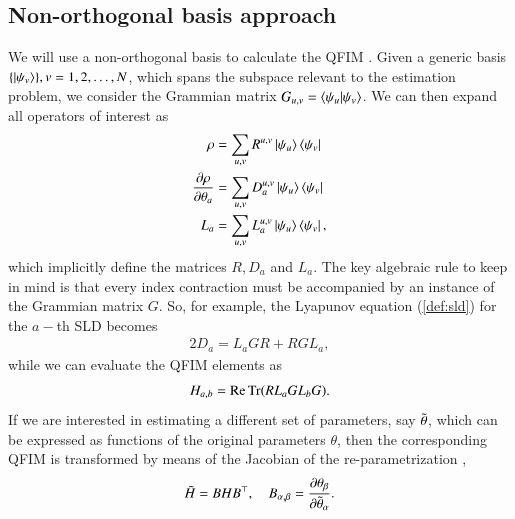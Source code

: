 \documentclass[reprint,amsmath,amssymb,aps,pra,floatfix]{revtex4-2}
\begin{document}
\subsection{Non-orthogonal basis approach}
We will use a non-orthogonal basis to calculate the QFIM \cite{genoni2019non,napoli2019towards,fiderer2021general}. Given a generic basis $\{\ket{\psi_v}\}, v = 1,2,\dots,N$, which spans the subspace relevant to the estimation problem, we consider the Grammian matrix $G_{u,v}=\braket{\psi_u}{\psi_v}$. We can then expand all operators of interest as
\begin{align}
    \rho &= \sum_{u,v} R^{u,v} \ket{\psi_u}\bra{\psi_v} \\
    \pdv{\rho}{\theta_a} &= \sum_{u,v} D_a^{u,v} \ket{\psi_u}\bra{\psi_v}\\
    L_a &=  \sum_{u,v} L_a^{u,v} \ket{\psi_u}\bra{\psi_v},
\end{align}
which implicitly define the matrices ${R}, D_a$ and $L_a$. The key algebraic rule to keep in mind is that every index contraction must be accompanied by an instance of the Grammian matrix ${G}$. So, for example, the Lyapunov equation (\ref{def:sld}) for the $a-$th SLD becomes
\begin{align}
    2 {D}_a = {L}_a{G}{R} + {R}{G}{L}_a,
    \label{eq:sld_nonorthogonal}
\end{align}
while we can evaluate the QFIM elements as
\begin{align}
    H_{a,b} = \Re \Tr( R L_a  G L_b G).
    \label{eq:qfi_nonorthogonal}
\end{align}
If we are interested in estimating a different set of parameters, say $\Tilde{\theta}$, which can be expressed as functions of the original parameters $\theta$, then the corresponding QFIM is transformed by means of the Jacobian of the re-parametrization \cite{paris2009quantum},
\begin{align}
    \Tilde{H} = B H B^\top, \quad
    B_{\alpha,\beta} = \pdv{\theta_\beta}{\Tilde{\theta}_\alpha}.
    \label{def:jacobian}
\end{align}
\end{document}
